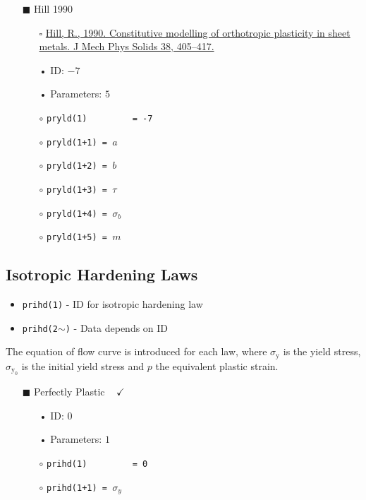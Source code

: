 \documentclass[11pt,a4paper,twoside,final,onecolumn,titlepage]{article}
\newcommand{\verified}{\hspace{0.5pt} {\LARGE $\checkmark$}}
\begin{document}
\newpage
\begin{itemize}
	\item[\tiny$\blacksquare$] Hill 1990
	\begin{itemize}
		\item[\tiny$\square$] {\small \href{https://doi.org/10.1016/0022-5096(90)90006-p}{Hill, R., 1990. Constitutive modelling of orthotropic plasticity in sheet metals. J Mech Phys Solids 38, 405–417.}}\\
		\item[•] ID: $-7$
		\item[•] Parameters: $5$\\
		\item[$\circ$] \texttt{pryld(1)\,\,\,\,\,\,\,\,\,= -7}
		\item[$\circ$] \texttt{pryld(1+1) = $a$}
		\item[$\circ$] \texttt{pryld(1+2) = $b$}
		\item[$\circ$] \texttt{pryld(1+3) = $\tau$}
		\item[$\circ$] \texttt{pryld(1+4) = $\sigma_{b}$}
		\item[$\circ$] \texttt{pryld(1+5) = $m$}\\
	\end{itemize}
\end{itemize}

\vspace{0.2cm}
\subsection{Isotropic Hardening Laws}
\vspace{0.2cm}

\begin{itemize}
	\item \texttt{prihd(1)} - ID for isotropic hardening law
	\item \texttt{prihd(2$\mathtt{\sim}$)} - Data depends on ID
\end{itemize}

\noindent The equation of flow curve is introduced for each law, where $\sigma_{\textrm{y}}$ is the yield stress, $\sigma_{\textrm{y}_0}$ is the initial yield stress and $p$ the equivalent plastic strain.
\vspace{0.1cm}

\begin{itemize}
	\item[\tiny$\blacksquare$] Perfectly Plastic\,\,\,\,\,\verified{}
	\begin{itemize}
		\item[•] ID: $0$
		\item[•] Parameters: $1$\\
		\item[$\circ$] \texttt{prihd(1)\,\,\,\,\,\,\,\,\,= 0}
		\item[$\circ$] \texttt{prihd(1+1) = $\sigma_{y}$}\\
	\end{itemize}
\end{itemize}
\end{document}
